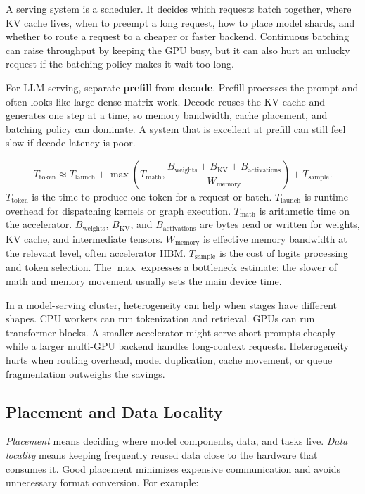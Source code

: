 A serving system is a scheduler. It decides which requests batch together, where KV cache lives, when to preempt a long request, how to place model shards, and whether to route a request to a cheaper or faster backend. Continuous batching can raise throughput by keeping the GPU busy, but it can also hurt an unlucky request if the batching policy makes it wait too long.

For LLM serving, separate \textbf{prefill} from \textbf{decode}. Prefill processes the prompt and often looks like large dense matrix work. Decode reuses the KV cache and generates one step at a time, so memory bandwidth, cache placement, and batching policy can dominate. A system that is excellent at prefill can still feel slow if decode latency is poor.

\begin{keyequation}
\[
  T_{\text{token}} \approx
  T_{\text{launch}} +
  \max\!\left(
    T_{\text{math}},
    \frac{B_{\text{weights}} + B_{\text{KV}} + B_{\text{activations}}}{W_{\text{memory}}}
  \right)
  + T_{\text{sample}}.
\]
\tcblower
\(T_{\text{token}}\) is the time to produce one token for a request or batch. \(T_{\text{launch}}\) is runtime overhead for dispatching kernels or graph execution. \(T_{\text{math}}\) is arithmetic time on the accelerator. \(B_{\text{weights}}\), \(B_{\text{KV}}\), and \(B_{\text{activations}}\) are bytes read or written for weights, KV cache, and intermediate tensors. \(W_{\text{memory}}\) is effective memory bandwidth at the relevant level, often accelerator HBM. \(T_{\text{sample}}\) is the cost of logits processing and token selection. The \(\max\) expresses a bottleneck estimate: the slower of math and memory movement usually sets the main device time.
\end{keyequation}

In a model-serving cluster, heterogeneity can help when stages have different shapes. CPU workers can run tokenization and retrieval. GPUs can run transformer blocks. A smaller accelerator might serve short prompts cheaply while a larger multi-GPU backend handles long-context requests. Heterogeneity hurts when routing overhead, model duplication, cache movement, or queue fragmentation outweighs the savings.

\subsection{Placement and Data Locality}

\emph{Placement} means deciding where model components, data, and tasks live. \emph{Data locality} means keeping frequently reused data close to the hardware that consumes it. Good placement minimizes expensive communication and avoids unnecessary format conversion. For example:

